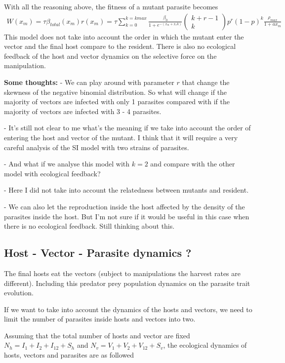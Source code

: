 \documentclass{article}
\begin{document}
With all the reasoning above, the fitness of a mutant parasite becomes
\begin{align*}
    W(x_m) = \tau \beta_{total}(x_m) r(x_m) = \tau \sum_{k = 0}^{k = kmax} \frac{\beta_0}{1 + e^{-(x_m + x_r  k)}} \begin{pmatrix} k + r - 1 \\ k\end{pmatrix}p^r (1 -p)^k  \frac{\rho_{max}}{1 + a x_m}
\end{align*}
This model does not take into account the order in which the mutant enter the vector and the final host compare to the resident. There is also no ecological feedback of the host and vector dynamics on the selective force on the manipulation.

\textbf{Some thoughts:} 
- We can play around with parameter $r$ that change the skewness of the negative binomial distribution. So what will change if the majority of vectors are infected with only 1 parasites compared with if the majority of vectors are infected with 3 - 4 parasites.

- It's still not clear to me what's the meaning if we take into account the order of entering the host and vector of the mutant. I think that it will require a very careful analysis of the SI model with two strains of parasites. 

- And what if we analyse this model with $k = 2$ and compare with the other model with ecological feedback?

- Here I did not take into account the relatedness between mutants and resident. 

- We can also let the reproduction inside the host affected by the density of the parasites inside the host. But I'm not sure if it would be useful in this case when there is no ecological feedback. Still thinking about this.

\subsection{Host - Vector - Parasite dynamics ?}

The final hosts eat the vectors (subject to manipulations the harvest rates are different).
Including this predator prey population dynamics on the parasite trait evolution.


If we want to take into account the dynamics of the hosts and vectors, we need to limit the number of parasites inside hosts and vectors into two.

Assuming that the total number of hosts and vector are fixed $N_h = I_1 + I_2 + I_{12} + S_h$ and $N_v = V_1 + V_2 + V_{12} + S_v$, the ecological dynamics of hosts, vectors and parasites are as followed
\end{document}
